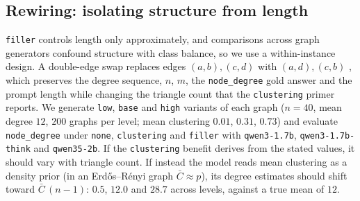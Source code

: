 \documentclass[11pt]{article}
\begin{document}
\begin{table}[t]
\centering
\footnotesize
\setlength{\tabcolsep}{3.2pt}
\caption{Shortcut bars at $n{=}40$ (mean over seven densities): accuracy of
a solver that reads only the rendered primer, never the graph.
\textbf{Bold}: the primer content alone determines the answer. The unbolded
$1.00$ entries reflect a constant gold answer, not primer content.}
\label{tab:shortcut}
\end{table}

\subsection{Rewiring: isolating structure from length}
\label{sec:rewiring}

\texttt{filler} controls length only approximately, and comparisons across
graph generators confound structure with class balance, so we use a
within-instance design. A double-edge swap replaces edges $(a,b),(c,d)$
with $(a,d),(c,b)$ \citep{fosdick2018configuring}, which preserves the
degree sequence, $n$, $m$, the \texttt{node\_degree} gold answer and the
prompt length while changing the triangle count that the
\texttt{clustering} primer reports. We generate \texttt{low},
\texttt{base} and \texttt{high} variants of each graph ($n{=}40$, mean
degree $12$, $200$ graphs per level; mean clustering $0.01$, $0.31$,
$0.73$) and evaluate \texttt{node\_degree} under \texttt{none},
\texttt{clustering} and \texttt{filler} with \texttt{qwen3-1.7b},
\texttt{qwen3-1.7b-think} and \texttt{qwen35-2b}. If the
\texttt{clustering} benefit derives from the stated values, it should vary
with triangle count. If instead the model reads mean clustering as a
density prior (in an Erd\H{o}s--R\'enyi graph $\bar{C}\approx p$), its
degree estimates should shift toward $\bar{C}\,(n-1)$: $0.5$, $12.0$ and
$28.7$ across levels, against a true mean of $12$.
\end{document}
